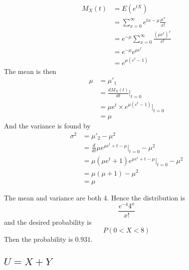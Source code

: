 \documentclass[answers]{exam}
\begin{document}
\begin{questions}

\begin{solution}
	\begin{align*}
		M_X(t) &= E(e^{tX}) \\
		       &= \sum_{x=0}^\infty e^{tx-\mu}\frac{\mu^x}{x!} \\
		       &= e^{-\mu} \sum_{x=0}^\infty \frac{(\mu e^t)^x}{x!} \\
		       &= e^{-\mu} e^{\mu e^t} \\
		       &= e^{\mu(e^t-1)}
	\end{align*}
	The mean is then
	\begin{align*}
		\mu &= \mu'_1 \\
		    &= \frac{dM_X(t)}{dt} \Big |_{t=0} \\
		    &= \mu e^t\times e^{\mu(e^t-1)} \Big |_{t=0} \\
		    &= \mu
	\end{align*}
	And the variance is found by
	\begin{align*}
		\sigma^2 &= \mu'_2 - \mu^2 \\
			 &= \frac{d}{dt} \mu e^{\mu e^t + t - \mu} \Big |_{t=0} - \mu^2 \\
			 &= \mu(\mu e^t + 1) e^{\mu e^t + t - \mu} \Big |_{t=0} - \mu^2 \\
			 &= \mu(\mu + 1) - \mu^2 \\
			 &= \mu
	\end{align*}
\end{solution}


\begin{solution}
	The mean and variance are both 4. Hence the distribution is
	$$\frac{e^{-4}4^x}{x!}$$
	and the desired probability is
	$$P(0 < X < 8)$$
	Then the probability is $0.931$.
\end{solution}


\begin{parts}
	\part{$U=X+Y$}

\end{parts}
\end{questions}
\end{document}
